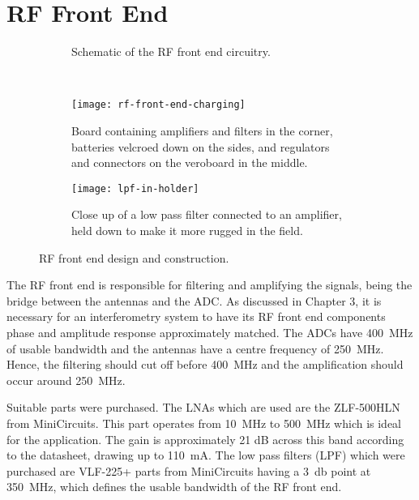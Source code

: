 \section{RF Front End}

\begin{figure}
  \centering
  \begin{subfigure}{\textwidth}
    \centering
    
    \caption{Schematic of the RF front end circuitry.}
  \end{subfigure}\\[1em]
  \begin{subfigure}{\textwidth}
    \centering
    \texttt{[image: rf-front-end-charging]}
    \caption{Board containing amplifiers and filters in the corner, batteries velcroed down on the sides, and regulators and connectors on the veroboard in the middle.}
  \end{subfigure}
  \begin{subfigure}{\textwidth}
    \centering
    \texttt{[image: lpf-in-holder]}
    \caption{Close up of a low pass filter connected to an amplifier, held down to make it more rugged in the field.}
  \end{subfigure}
  \caption{RF front end design and construction.}
  \label{fig:rf-front-end:circuit-board}
\end{figure}

The RF front end is responsible for filtering and amplifying the signals, being the bridge between the antennas and the ADC. As discussed in Chapter 3, it is necessary for an interferometry system to have its RF front end components phase and amplitude response approximately matched.
The ADCs have \SI{400}{\mega\hertz} of usable bandwidth and the antennas have a centre frequency of \SI{250}{\mega\hertz}. Hence, the filtering should cut off before \SI{400}{\mega\hertz} and the amplification should occur around \SI{250}{\mega\hertz}. 

Suitable parts were purchased. The LNAs which are used are the ZLF-500HLN from MiniCircuits. This part operates from \SI{10}{\mega\hertz} to \SI{500}{\mega\hertz} which is ideal for the application. The gain is approximately 21 dB across this band according to the datasheet, drawing up to \SI{110}{\milli\ampere}.  The low pass filters (LPF) which were purchased are VLF-225+ parts from MiniCircuits having a \SI{3}{\decibel} point at \SI{350}{\mega\hertz}, which defines the usable bandwidth of the RF front end.

